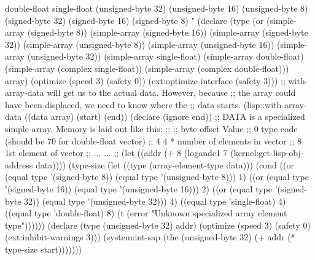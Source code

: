 \begin{example}
                  double-float
                  single-float
                  (unsigned-byte 32)
                  (unsigned-byte 16)
                  (unsigned-byte  8)
                  (signed-byte 32)
                  (signed-byte 16)
                  (signed-byte  8)
"
  (declare (type (or (simple-array (signed-byte 8))
                     (simple-array (signed-byte 16))
                     (simple-array (signed-byte 32))
                     (simple-array (unsigned-byte 8))
                     (simple-array (unsigned-byte 16))
                     (simple-array (unsigned-byte 32))
                     (simple-array single-float)
                     (simple-array double-float)
                     (simple-array (complex single-float))
                     (simple-array (complex double-float)))
                 array)
           (optimize (speed 3) (safety 0))
           (ext:optimize-interface (safety 3)))
  ;; with-array-data will get us to the actual data.  However, because
  ;; the array could have been displaced, we need to know where the
  ;; data starts.
  (lisp::with-array-data ((data array)
                          (start)
                          (end))
    (declare (ignore end))
    ;; DATA is a specialized simple-array.  Memory is laid out like this:
    ;;
    ;;   byte offset    Value
    ;;        0         type code (should be 70 for double-float vector)
    ;;        4         4 * number of elements in vector
    ;;        8         1st element of vector
    ;;      ...         ...
    ;;
    (let ((addr (+ 8 (logandc1 7 (kernel:get-lisp-obj-address data))))
          (type-size (let ((type (array-element-type data)))
                       (cond ((or (equal type '(signed-byte 8))
                                  (equal type '(unsigned-byte 8)))
                              1)
                             ((or (equal type '(signed-byte 16))
                                  (equal type '(unsigned-byte 16)))
                              2)
                             ((or (equal type '(signed-byte 32))
                                  (equal type '(unsigned-byte 32)))
                              4)
                             ((equal type 'single-float)
                              4)
                             ((equal type 'double-float)
                              8)
                             (t
                              (error "Unknown specialized array element type"))))))
      (declare (type (unsigned-byte 32) addr)
               (optimize (speed 3) (safety 0) (ext:inhibit-warnings 3)))
      (system:int-sap (the (unsigned-byte 32)
                        (+ addr (* type-size start)))))))
\end{example}

